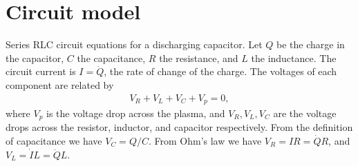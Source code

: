 \documentclass{article}
\begin{document}
\section{Circuit model}

Series RLC circuit equations for a discharging capacitor.
Let $Q$ be the charge in the capacitor, $C$ the capacitance, $R$ the resistance,
and $L$ the inductance.
The circuit current is $I = \dot{Q}$, the rate of change of the charge.
The voltages of each component are related by
\begin{align}
V_R + V_L + V_C + V_p = 0,
\end{align}
where $V_p$ is the voltage drop across the plasma, and $V_R, V_L, V_C$ are the voltage drops across the resistor, inductor, and capacitor respectively.
From the definition of capacitance we have $V_C = Q/C$. From Ohm's law we have $V_R = IR = \dot{Q} R$, 
and $V_L = \dot{I} L = \ddot{Q} L$.



\printbibliography
\end{document}
